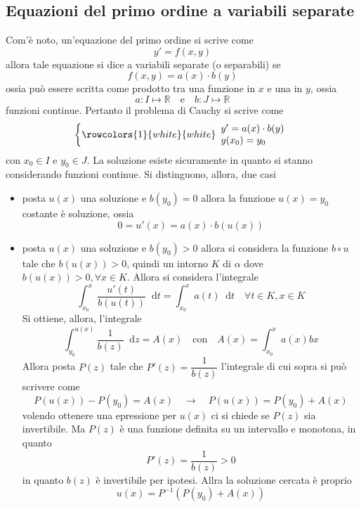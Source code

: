 \documentclass[a4paper]{extarticle}
\newcommand*\dif{\mathop{}\!\mathrm{d}}
\begin{document}
\vspace{1em}
\subsection{Equazioni del primo ordine a variabili separate}
Com'è noto, un'equazione del primo ordine si scrive come
\[y'=f(x,y)\]
allora tale equazione si dice a variabili separate (o separabili) se
\[f(x,y)=a(x) \cdot b(y)\]
ossia può essere scritta come prodotto tra una funzione in $x$ e una in $y$, ossia
\[a : I \longmapsto \mathbb{R} \hspace{1em} \text{e} \hspace{1em} b : J \longmapsto \mathbb{R}\]
funzioni continue. Pertanto il problema di Cauchy si scrive come
\[\left\{
    \rowcolors{1}{white}{white}
    \begin{array}{lll}
        y'=a(x) \cdot b(y)\\
        y(x_0)=y_0
    \end{array}
\right.\]
con $x_0 \in I$ e $y_0 \in J$. La soluzione esiste sicuramente in quanto si stanno considerando funzioni continue. Si distinguono, allora, due casi
\begin{itemize}
    \item posta $u(x)$ una soluzione e $b(y_0)=0$ allora la funzione $u(x) = y_0$ costante è soluzione, ossia
    \[0 = u'(x) = a(x) \cdot b(u(x))\]

    \item posta $u(x)$ una soluzione e $b(y_0) > 0$ allora si considera la funzione $b \circ u$ tale che $b(u(x)) > 0$, quindi un intorno $K$ di $\alpha$ dove $b(u(x)) > 0, \forall x \in K$. Allora si considera l'integrale
    \[\int_{x_0}^x \dfrac{u'(t)}{b(u(t))} \dif t = \int_{x_0}^x a(t) \dif t \hspace{1em} \forall t \in K, x \in K\]
    Si ottiene, allora, l'integrale
    \[\int_{y_0}^{u(x)} \dfrac{1}{b(z)} \dif z = A(x) \hspace{1em} \text{con} \hspace{1em} A(x) = \int_{x_0}^x a(x) b x\]
    Allora posta $P(z)$ tale che $P'(z) = \dfrac{1}{b(z)}$ l'integrale di cui sopra si può scrivere come
    \[P(u(x)) - P(y_0) = A(x) \hspace{1em} \rightarrow \hspace{1em} P(u(x)) = P(y_0) + A(x)\]
    volendo ottenere una epressione per $u(x)$ ci si chiede se $P(z)$ sia invertibile. Ma $P(z)$ è una funzione definita su un intervallo e monotona, in quanto
    \[P'(z) = \dfrac{1}{b(z)} > 0\]
    in quanto $b(z)$ è invertibile per ipotesi. Allra la soluzione cercata è proprio
    \[u(x) = P^{-1} \left(P(y_0) + A(x)\right)\]
\end{itemize}
\end{document}

